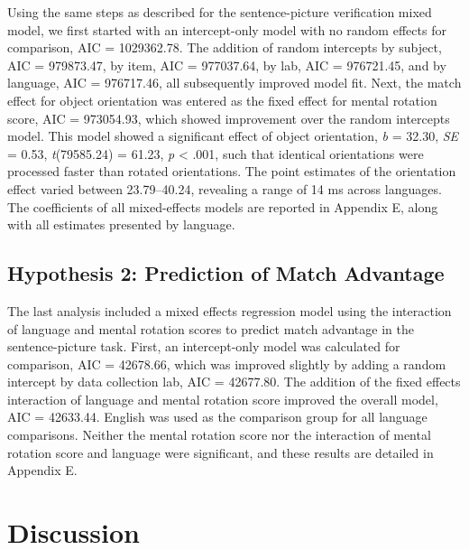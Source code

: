 \documentclass[
  man,mask,floatsintext]{apa7}
\begin{document}
Using the same steps as described for the sentence-picture verification
mixed model, we first started with an intercept-only model with no
random effects for comparison, AIC =
1029362.78. The
addition of random intercepts by subject, AIC =
979873.47, by item,
AIC = 977037.64, by
lab, AIC = 976721.45,
and by language, AIC =
976717.46, all
subsequently improved model fit. Next, the match effect for object
orientation was entered as the fixed effect for mental rotation score,
AIC = 973054.93,
which showed improvement over the random intercepts model. This model
showed a significant effect of object orientation, \emph{b} =
32.30, \emph{SE} =
0.53,
\emph{t}(79585.24) =
61.23, \emph{p}
\textless{} .001, such that identical orientations were
processed faster than rotated orientations. The point estimates of the
orientation effect varied between 23.79--40.24, revealing a range of 14
ms across languages. The coefficients of all mixed-effects models are
reported in Appendix E, along with all estimates presented by language.

\hypertarget{hypothesis-2-prediction-of-match-advantage}{%
\subsection{Hypothesis 2: Prediction of Match Advantage}\label{hypothesis-2-prediction-of-match-advantage}}

The last analysis included a mixed effects regression model using the
interaction of language and mental rotation scores to predict match
advantage in the sentence-picture task. First, an intercept-only model
was calculated for comparison, AIC =
42678.66, which
was improved slightly by adding a random intercept by data collection
lab, AIC = 42677.80. The
addition of the fixed effects interaction of language and mental
rotation score improved the overall model, AIC =
42633.44. English
was used as the comparison group for all language comparisons. Neither
the mental rotation score nor the interaction of mental rotation score
and language were significant, and these results are detailed in
Appendix E.

\hypertarget{discussion}{%
\section{Discussion}\label{discussion}}
\end{document}

